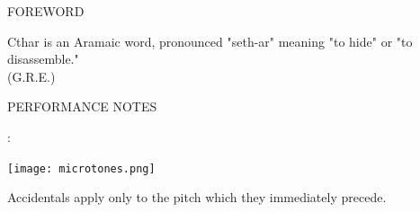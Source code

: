 \documentclass[10pt]{article}
\begin{document}
\vspace*{0.5\baselineskip}

\begin{center}
\huge FOREWORD
\end{center}

\begin{center}
Cthar is an Aramaic word, pronounced "seth-ar" meaning "to hide" or "to disassemble."\\
\phantom{text} \hfill (G.R.E.)
  \end{center}
  
\vspace*{2\baselineskip}

\begin{center}
\huge PERFORMANCE NOTES
\end{center}

\begin{center}
:
\end{center}

\begin{center}
\texttt{[image: microtones.png]}
\end{center}

\begin{center}
Accidentals apply only to the pitch which they immediately precede.
\end{center}
\end{document}
